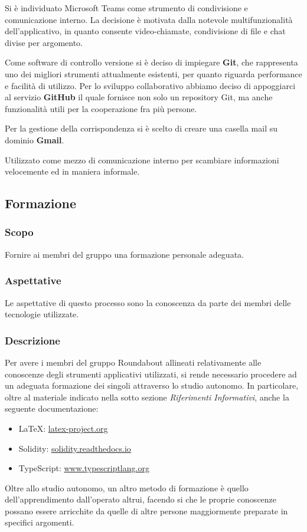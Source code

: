 				Si è individuato Microsoft Teams come strumento di condivisione e comunicazione interno. La decisione è motivata dalla notevole multifunzionalità dell'applicativo, in quanto consente video-chiamate, condivisione di file e chat divise per argomento.
				
				Come software di controllo versione si è deciso di impiegare \textbf{Git}, che rappresenta uno dei migliori strumenti attualmente esistenti, per quanto riguarda performance e facilità di utilizzo. Per lo sviluppo collaborativo abbiamo deciso di appoggiarci al servizio \textbf{GitHub} il quale fornisce non solo un repository Git, ma anche funzionalità utili per la cooperazione fra più persone.
							
				Per la gestione della corrispondenza si è scelto di creare una casella mail su dominio \textbf{Gmail}.
				
				Utilizzato come mezzo di comunicazione interno per scambiare informazioni velocemente ed in maniera informale.
				

	\subsection{Formazione}
	
		\subsubsection{Scopo}
		Fornire ai membri del gruppo una formazione personale adeguata.
		
		\subsubsection{Aspettative}
		Le aspettative di questo processo sono la conoscenza da parte dei membri delle tecnologie utilizzate.
		
		\subsubsection{Descrizione}		
		Per avere i membri del gruppo Roundabout allineati relativamente alle conoscenze degli strumenti applicativi utilizzati, si rende necessario procedere ad un adeguata formazione dei singoli attraverso lo studio autonomo. In particolare, oltre al materiale indicato nella sotto sezione \textit{Riferimenti Informativi}, anche la seguente documentazione:
		\begin{itemize}
			\item \LaTeX{}: \href{latex-project.org}{latex-project.org}
			\item Solidity: \href{solidity.readthedocs.io}{solidity.readthedocs.io}
			\item TypeScript: \href{www.typescriptlang.org}{www.typescriptlang.org}
		\end{itemize}
		Oltre allo studio autonomo, un altro metodo di formazione è quello dell'apprendimento dall'operato altrui, facendo si che le proprie conoscenze possano essere arricchite da quelle di altre persone maggiormente preparate in specifici argomenti.
